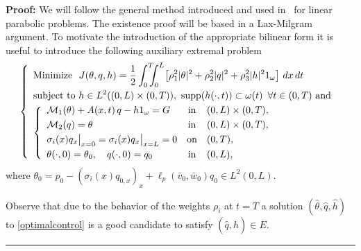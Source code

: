 \documentclass[10pt]{article}
\newenvironment{proof}[1][Proof]
{\noindent\textbf{#1:} }{\hfill\rule{0.5em}{0.5em}}
\def\dis{\displaystyle}
\def\om{\omega}
\def\\Phivec{\mathbf{\Phi}}
\newcommand{\iiTL}{\int_0^T\!\!\!\!\int_0^L }
\begin{document}
\begin{proof}
	We will follow the general method introduced and used in~\cite{fursikov-imanuvilov} for
	linear parabolic problems. The existence proof will be based in a Lax-Milgram argument.
	To motivate the introduction of the appropriate bilinear form it is useful to introduce
	the following auxiliary extremal problem
\begin{equation}\label{optimalcontrol}
\left\{
\begin{array}{llr}
	\dis \hbox{Minimize }   \ J(\theta,q,h) =  \frac{1}{2}\iiTL\! \left[\rho_1^2|\theta|^2+\rho_2^2|q|^2 +\rho_3^2|h|^21_{\om}\right]\,dx\,dt																\\
	\noalign{\smallskip}
	\dis \hbox{subject to }h\in L^2((0,L)\times(0,T)),\text{ supp}(h(\cdot,t))\subset\om(t)\,~\forall t\in(0,T)\text{ and } \\
	\noalign{\smallskip}
\left\{
\begin{array}{lcl}
			\mathcal{M}_1(\theta) + A(x,t)\,q- h1_{\omega}=G 		&  \mbox{in}&	(0,L) \times (0,T),		\\
			\noalign{\smallskip}\dis
			\mathcal{M}_2(q)  =  \theta					&  \mbox{in}&	(0,L) \times (0,T),		\\
			\noalign{\smallskip}\dis
			\sigma_i(x)q_{x}\big|_{x=0}=\sigma_i(x)q_{x}\big|_{x=L} = 0				& \mbox{on}&	 (0,T),	\\
			\noalign{\smallskip}\dis
			\theta(\cdot,0) =\theta_0,\quad q(\cdot,0) =q_0 		& \mbox{in}&	(0,L),
\end{array}
\right.
\end{array}
\right.
\end{equation}
	where $\theta_0=p_0-(\sigma_i (x)q_{0,x})_x +\ell_p(\bar v_0,\bar w_0)q_0\in L^2(0,L)$.


	Observe that due to the behavior of the weights $\rho_i$ at $t=T$
	 a solution $(\widehat{\theta},\widehat{q},\widehat{h})$ to \eqref{optimalcontrol} is a good candidate
	to satisfy  $(\widehat{q},\widehat{h})\in E$.


\end{proof}
\end{document}
